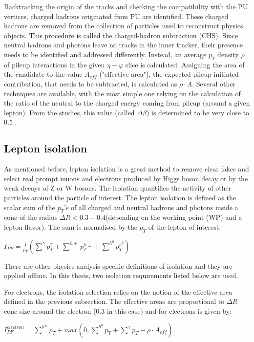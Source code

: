 \begin{small}
Backtracking the origin of the tracks and checking the compatibility with the PU vertices, charged hadrons originated from PU are identified. These charged hadrons are removed from the collection of particles used to reconstruct physics objects. This procedure is called the charged-hadron subtraction (CHS). Since neutral hadrons and photons leave no tracks in the inner tracker, their presence needs to be identified and addressed differently. Instead, an average  $p_T$ density $\rho$ of pileup interactions in the given $\eta - \varphi$ slice is calculated. Assigning the area of the candidate to the value $A_{eff}$ ("effective area"), the expected pileup initiated contribution, that needs to be subtracted, is calculated as $\rho \cdot A$. Several other techniques are available, with the most simple one relying on the calculation of the ratio of the neutral to the charged energy coming from pileup (around a given lepton). From the studies, this value (called $\Delta \beta$) is determined to be very close to 0.5 \cite{PU_mitigation}. 

\subsection{Lepton isolation}\label{sec:isolation}

As mentioned before, lepton isolation is a great method to remove clear fakes and select real  prompt  muons  and  electrons  produced  by Higgs boson decay or by the weak decays of Z or W bosons. The isolation quantifies the activity of other particles around the particle of interest. The lepton isolation is defined as the scalar sum of the $p_T$'s of all charged and neutral hadrons and photons inside a cone of the radius $\Delta R <  0.3 - 0.4 $(depending on the working point (WP) and a lepton flavor). The sum is normalised by the $p_T$ of the lepton of interest:

$I_{PF} = \frac{1}{p_T} (\sum^\gamma p^\gamma_T + \sum^{h \pm} p^{h \pm}_T + \sum^{h^0} p^{h^0 }_T)$

There are other physics analysis-specific definitions of isolation and they are applied offline. In this thesis, two isolation requirements listed below are used.

For electrons, the isolation selection relies on the notion of the effective area defined in the previous subsection. The effective areas are proportional to $\Delta R$ cone size around the electron (0.3 in this case) and for electrons is given by: 

$I^{electron}_{PF} = \sum^{h^\pm} p_T + max (0, \sum^{h^0} p_T + \sum^\gamma p_T - \rho \cdot A_{eff})$.


\end{small}
